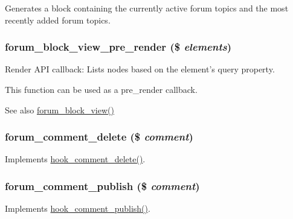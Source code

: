 Generates a block containing the currently active forum topics and the most recently added forum topics. \hypertarget{forum_8module_aceb291bf6ba87c91980bb20d0b6459f1}{
\subsubsection[{forum\_\-block\_\-view\_\-pre\_\-render}]{\setlength{\rightskip}{0pt plus 5cm}forum\_\-block\_\-view\_\-pre\_\-render (\$ {\em elements})}}
\label{forum_8module_aceb291bf6ba87c91980bb20d0b6459f1}
Render API callback: Lists nodes based on the element's query property.

This function can be used as a pre\_\-render callback.

\begin{DoxySeeAlso}{See also}
\hyperlink{forum_8module_ab6b1e6be188dacf620ab5ece0861a2ac}{forum\_\-block\_\-view()} 
\end{DoxySeeAlso}
\hypertarget{forum_8module_a7c2baba0a86b56c79a8a90d79f6155e2}{
\subsubsection[{forum\_\-comment\_\-delete}]{\setlength{\rightskip}{0pt plus 5cm}forum\_\-comment\_\-delete (\$ {\em comment})}}
\label{forum_8module_a7c2baba0a86b56c79a8a90d79f6155e2}
Implements \hyperlink{group__hooks_gab8d94c5665313a2d174628cc219f0395}{hook\_\-comment\_\-delete()}. \hypertarget{forum_8module_ae3fb23a337e109f966fdebf7e4453aaa}{
\subsubsection[{forum\_\-comment\_\-publish}]{\setlength{\rightskip}{0pt plus 5cm}forum\_\-comment\_\-publish (\$ {\em comment})}}
\label{forum_8module_ae3fb23a337e109f966fdebf7e4453aaa}
Implements \hyperlink{group__hooks_ga4c4be9019e5cc7f92e8ccc03b595a64b}{hook\_\-comment\_\-publish()}.

